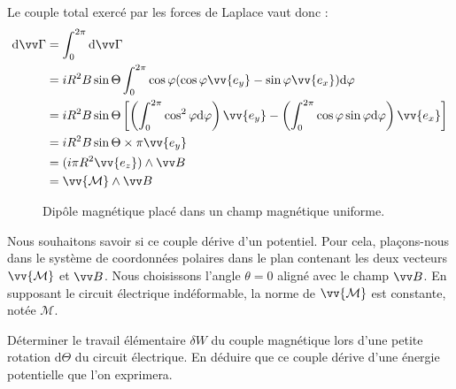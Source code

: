 \documentclass[11pt,fleqn]{book} %
\newcommand{\dd}{\mathrm{d}}
\begin{document}
\begin{demonstration}
Le couple total exercé par les forces de Laplace vaut donc :
\begin{align}
\dd \vv \Gamma &= \int_0^{2\pi} \dd \vv \Gamma \\
&= i R^2  B \sin \Theta \int_0^{2\pi} \cos \varphi (\cos \varphi \vv{e_y} - \sin \varphi \vv{e_x}) \dd \varphi \\
&= i R^2  B \sin \Theta \left[ \left( \int_0^{2\pi} \cos^2 \varphi \dd \varphi \right) \vv{e_y} - \left( \int_0^{2\pi} \cos \varphi \sin \varphi \dd \varphi \right) \vv{e_x} \right] \\
&= i R^2  B \sin \Theta \times \pi \vv{e_y} \\
&= (i \pi R^2 \vv{e_z}) \wedge \vv B \\
&= \vv{\mathcal{M}} \wedge \vv B
\end{align}
\end{demonstration}

\begin{figure}[htbp]
    \centering


    
    \caption{Dipôle magnétique placé dans un champ magnétique uniforme.}
    \label{fig:placeholder}
\end{figure}

Nous souhaitons savoir si ce couple dérive d'un potentiel. Pour cela, plaçons-nous dans le système de coordonnées polaires dans le plan contenant les deux vecteurs $\vv{\mathcal{M}}$ et $\vv B$. Nous choisissons l'angle $\theta=0$ aligné avec le champ $\vv B$. En supposant le circuit électrique indéformable, la norme de $\vv{\mathcal{M}}$ est constante, notée $\mathcal{M}$.
\begin{capex}
Déterminer le travail élémentaire $\delta W$ du couple magnétique lors d'une petite rotation $\dd \Theta$ du circuit électrique. En déduire que ce couple dérive d'une énergie potentielle que l'on exprimera.
\end{capex}
\end{document}
